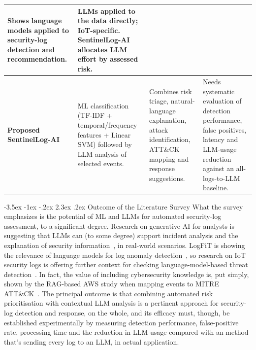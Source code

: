 \documentclass[12pt,a4paper]{report}
\makeatletter
\renewcommand\section{\@startsection {section}{1}{\z@}%
  {-3.5ex \@plus -1ex \@minus -.2ex}%
  {2.3ex \@plus .2ex}%
  {\normalfont\fontsize{17}{21}\selectfont\bfseries}}
\makeatother
\begin{document}
\begin{longtable}{@{}>{\raggedright\arraybackslash}p{2.5cm} >{\raggedright\arraybackslash}p{4.5cm} >{\raggedright\arraybackslash}p{4cm} >{\raggedright\arraybackslash}p{4cm}@{}}
Shows language models applied to security-log detection and recommendation. &
LLMs applied to the data directly; IoT-specific. SentinelLog-AI allocates LLM effort by assessed risk.\\
\midrule
\textbf{Proposed SentinelLog-AI} &
ML classification (TF-IDF + temporal/frequency features + Linear SVM) followed by LLM analysis of selected events. &
Combines risk triage, natural-language explanation, attack identification, ATT\&CK mapping and response suggestions. &
Needs systematic evaluation of detection performance, false positives, latency and LLM-usage reduction against an all-logs-to-LLM baseline.\\
\end{longtable}
\normalsize

\section{Outcome of the Literature Survey}
What the survey emphasizes is the potential of ML and LLMs for automated security-log assessment, to a significant degree. Research on generative AI for analysts is suggesting that LLMs can (to some degree) support incident analysis and the explanation of security information~\cite{balogh2024}, in real-world scenarios. LogFiT is showing the relevance of language models for log anomaly detection~\cite{logfit}, so research on IoT security logs is offering further context for checking language-model-based threat detection~\cite{tejero2025}. In fact, the value of including cybersecurity knowledge is, put simply, shown by the RAG-based AWS study when mapping events to MITRE ATT\&CK~\cite{adediran2026}.
The principal outcome is that combining automated risk prioritisation with contextual LLM analysis is a pertinent approach for security-log detection and response, on the whole, and its efficacy must, though, be established experimentally by measuring detection performance, false-positive rate, processing time and the reduction in LLM usage compared with an method that's sending every log to an LLM, in actual application.
\end{document}
